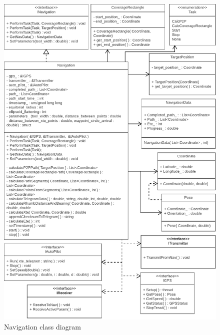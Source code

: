 \begin{figure}[H]
\centering
\includegraphics[width=1\linewidth]{Images/Design/Navigation_class_diagram}
\caption{Navigation class diagram}
\label{fig:Navigation}
\end{figure}

